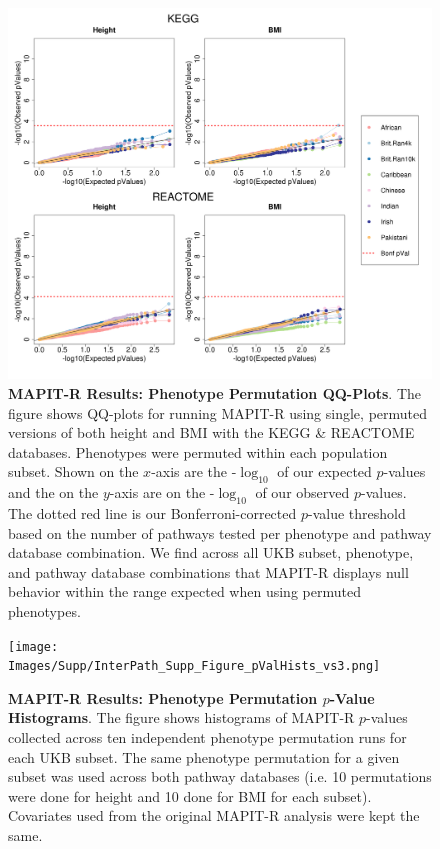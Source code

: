 \documentclass[12pt, a4paper]{article}
\begin{document}
\begin{figure}[htbp]
\centering
\includegraphics[scale=.35]{Images/Supp/InterPath_Supp_Figure_perm1_QQPlots_AllPaths_vs1.png}
\caption[TBD]{\textbf{MAPIT-R Results: Phenotype Permutation QQ-Plots}. The figure shows QQ-plots for running MAPIT-R using single, permuted versions of both height and BMI with the KEGG \& REACTOME databases. Phenotypes were permuted within each population subset. Shown on the $x$-axis are the -$\log_{10}$ of our expected $p$-values and the on the $y$-axis are on the -$\log_{10}$ of our observed $p$-values. The dotted red line is our Bonferroni-corrected $p$-value threshold based on the number of pathways tested per phenotype and pathway database combination. We find across all UKB subset, phenotype, and pathway database combinations that MAPIT-R displays null behavior within the range expected when using permuted phenotypes.}
\label{InterPath-Supp-Figure-perm1-QQPlots-AllPaths}
\end{figure}
\clearpage

\setlength{\footskip}{3cm}
\begin{figure}[htbp]
\centering
\vspace*{-2cm}
\texttt{[image: Images/Supp/InterPath\_Supp\_Figure\_pValHists\_vs3.png]}
\caption[TBD]{\textbf{MAPIT-R Results: Phenotype Permutation $p$-Value Histograms}. The figure shows histograms of MAPIT-R $p$-values collected across ten independent phenotype permutation runs for each UKB subset. The same phenotype permutation for a given subset was used across both pathway databases (i.e. 10 permutations were done for height and 10 done for BMI for each subset). Covariates used from the original MAPIT-R analysis were kept the same.}
\label{InterPath-Supp-Figure-10perms-pValHists}
\end{figure}
\clearpage
\setlength{\footskip}{1cm}
\end{document}
